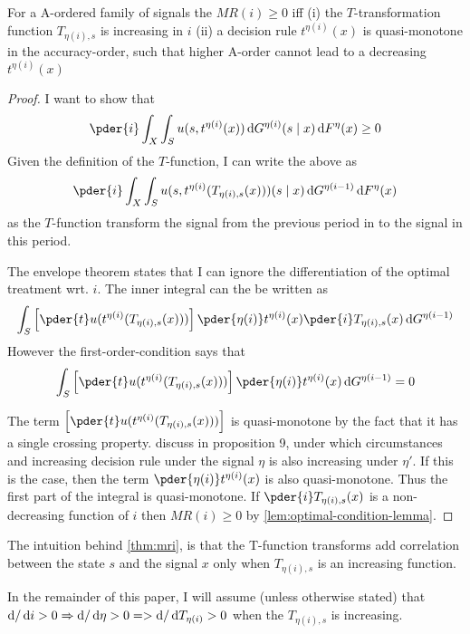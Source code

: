 \begin{theorem}\label{thm:mri}
For a A-ordered family of signals the \(MR(i)\geq0\) iff (i) the \(T\)-transformation function \(T_{\eta(i),s}\) is increasing in \(i\) (ii) a decision rule \(t^{\eta(i)}(x)\) is quasi-monotone in the accuracy-order, such that higher A-order cannot lead to a decreasing \(t^{\eta(i)}(x)\)
\end{theorem}
\begin{proof}
I want to show that
\[
	\pder{i}\int_X\int_S u(s,t^{\eta(i)}(x))\dif G^{\eta(i)}(s\mid x)\dif F^\eta(x)\geq0
\]
Given the definition of the \(T\)-function, I can write the above as
\[
	\pder{i}\int_X\int_S u(s,t^{\eta(i)}(T_{\eta(i),s}(x)))(s\mid x)\dif G^{\eta(i-1)}\dif F^\eta(x)
\]
as the \(T\)-function transform the signal from the previous period in to the signal in this period.

The envelope theorem states that I can ignore the differentiation of the optimal treatment wrt. \(i\). The inner integral can the be written as
\[
	\int_S \left[\pder{t}u(t^{\eta(i)}(T_{\eta(i),s}(x)))\right]\pder{\eta(i)}t^{\eta(i)}(x)\pder{i}T_{\eta(i),s}(x)\dif G^{\eta(i-1)}
\]
However the first-order-condition says that
\[
	\int_S \left[\pder{t}u(t^{\eta(i)}(T_{\eta(i),s}(x)))\right]\pder{\eta(i)}t^{\eta(i)}(x)\dif G^{\eta(i-1)}=0
\]

The term \(\left[\pder{t}u(t^{\eta(i)}(T_{\eta(i),s}(x)))\right]\) is quasi-monotone by the fact that it has a single crossing property. \textcite{Quah2009} discuss in proposition 9, under which circumstances and increasing decision rule under the signal \(\eta\) is also increasing under \(\eta'\). If this is the case, then the term \(\pder{\eta(i)}t^{\eta(i)}(x)\) is also quasi-monotone. Thus the first part of the integral is quasi-monotone. If \(\pder{i}T_{\eta(i),s}(x)\) is a non-decreasing function of \(i\) then \(MR(i)\geq0\) by \cref{lem:optimal-condition-lemma}.
\end{proof}
The intuition behind \cref{thm:mri}, is that the T-function transforms add correlation between the state \(s\) and the signal \(x\) only when \(T_{\eta(i),s}\) is an increasing function. 

In the remainder of this paper, I will assume (unless otherwise stated) that \(\dif /\dif i >0 \Rightarrow \dif/\dif \eta >0 => \dif / \dif T_{\eta(i)}>0\) when the \(T_{\eta(i),s}\) is increasing. 

